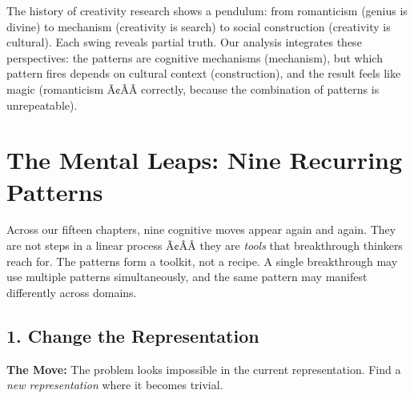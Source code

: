 The history of creativity research shows a pendulum: from romanticism (genius is divine) to mechanism (creativity is search) to social construction (creativity is cultural). Each swing reveals partial truth. Our analysis integrates these perspectives: the patterns are cognitive mechanisms (mechanism), but which pattern fires depends on cultural context (construction), and the result feels like magic (romanticism Ã¢ÂÂ correctly, because the combination of patterns is unrepeatable).

\section{The Mental Leaps: Nine Recurring Patterns}
\label{sec:anatomy:patterns}

Across our fifteen chapters, nine cognitive moves appear again and again. They are not steps in a linear process Ã¢ÂÂ they are \emph{tools} that breakthrough thinkers reach for. The patterns form a toolkit, not a recipe. A single breakthrough may use multiple patterns simultaneously, and the same pattern may manifest differently across domains.

\subsection{1. Change the Representation}
\label{sec:anatomy:repr}

\textbf{The Move:} The problem looks impossible in the current representation. Find a \emph{new representation} where it becomes trivial.

